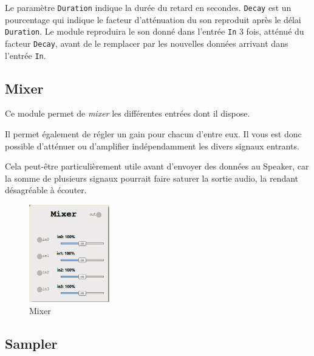 \documentclass[a4paper,oneside,frenchb,10pt]{article}
\begin{document}
Le paramètre \verb!Duration! indique la durée du retard en secondes.
\verb!Decay! est un pourcentage qui indique le facteur d'atténuation du
son reproduit après le délai \verb!Duration!. Le module reproduira le
son donné dans l'entrée \verb!In! 3 fois, atténué du facteur
\verb!Decay!, avant de le remplacer par les nouvelles données arrivant
dans l'entrée \verb!In!.

\subsection{Mixer}

\begin{multicols}{2}
Ce module permet de \emph{mixer} les différentes entrées dont il dispose.

Il permet également de régler un gain pour chacun d'entre eux. Il vous est
donc possible d'atténuer ou d'amplifier indépendamment les divers signaux entrants.

Cela peut-être particulièrement utile avant d'envoyer des données au
Speaker, car la somme de plusieurs signaux pourrait faire saturer la
sortie audio, la rendant désagréable à écouter.

\begin{figure}[H]
\centering
\includegraphics[width=3.5cm]{../img/png/mixer.png}
\caption{Mixer}
\end{figure}
\end{multicols}

\subsection{Sampler}
\end{document}
